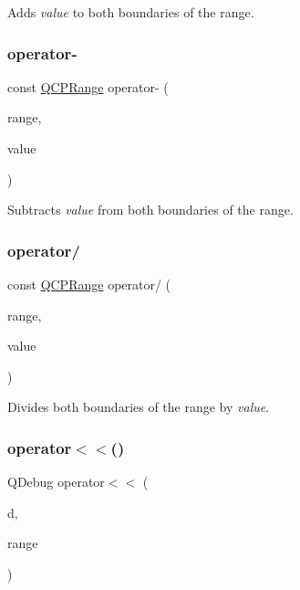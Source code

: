 Adds {\itshape value} to both boundaries of the range. \mbox{\label{class_q_c_p_range_a797f82830b516646da8873f82e39e356}} 
\subsubsection{\texorpdfstring{operator-\/}{operator-}}
{\footnotesize\ttfamily const \mbox{\hyperlink{class_q_c_p_range}{Q\+C\+P\+Range}} operator-\/ (\begin{DoxyParamCaption}\item[{const \mbox{\hyperlink{class_q_c_p_range}{Q\+C\+P\+Range}} \&}]{range,  }\item[{double}]{value }\end{DoxyParamCaption})\hspace{0.3cm}{\ttfamily [friend]}}

Subtracts {\itshape value} from both boundaries of the range. \mbox{\label{class_q_c_p_range_a4b366a3a21974c88e09b0d39d4a24a4b}} 
\subsubsection{\texorpdfstring{operator/}{operator/}}
{\footnotesize\ttfamily const \mbox{\hyperlink{class_q_c_p_range}{Q\+C\+P\+Range}} operator/ (\begin{DoxyParamCaption}\item[{const \mbox{\hyperlink{class_q_c_p_range}{Q\+C\+P\+Range}} \&}]{range,  }\item[{double}]{value }\end{DoxyParamCaption})\hspace{0.3cm}{\ttfamily [friend]}}

Divides both boundaries of the range by {\itshape value}. \mbox{\label{class_q_c_p_range_ab4b7d434541ec2e2e00ef3764dde90d8}} 
\subsubsection{\texorpdfstring{operator$<$$<$()}{operator<<()}}
{\footnotesize\ttfamily Q\+Debug operator$<$$<$ (\begin{DoxyParamCaption}\item[{Q\+Debug}]{d,  }\item[{const \mbox{\hyperlink{class_q_c_p_range}{Q\+C\+P\+Range}} \&}]{range }\end{DoxyParamCaption})\hspace{0.3cm}{\ttfamily [related]}}

